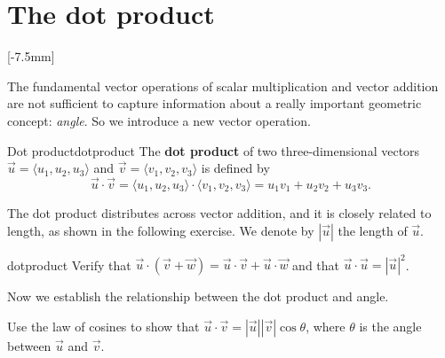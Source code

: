 \documentclass{watsonbook}
\begin{document}
\section{The dot product} \label{sec:dot} 

[-7.5mm]

The fundamental vector operations of scalar multiplication and vector
addition are not sufficient to capture information about a really important
geometric concept: \textit{angle}. So we introduce a new vector
operation.

\begin{defn}{Dot product}{dotproduct}
  The \textbf{dot product} of two three-dimensional vectors $\vec{u}
  = \langle u_1, u_2, u_3 \rangle$
  and $\vec{v} =  \langle v_1, v_2, v_3 \rangle$ is defined by 
  \[
    \vec{u} \cdot \vec{v} = \langle u_1, u_2, u_3 \rangle \cdot
    \langle v_1, v_2, v_3 \rangle = u_1 v_1 + u_2 v_2+ u_3v_3.
  \]
\end{defn}

The dot product distributes across vector addition, and it is closely
related to length, as shown in the following exercise. We denote by
$|\vec{u}|$ the length of $\vec{u}$. 

\begin{exercise}{}{dotproduct}
  Verify that $\vec{u} \cdot (\vec{v} + \vec{w}) = \vec{u} \cdot
  \vec{v} + \vec{u} \cdot \vec{w}$ and that $\vec{u} \cdot
  \vec{u} = |\vec{u}|^2$.
\end{exercise}

Now we establish the relationship between the dot product and angle.
\enlargethispage{5mm} 

\begin{example}{}{}
  Use the law of cosines to show that $\vec{u} \cdot \vec{v} =
  |\vec{u}| |\vec{v}| \cos\theta$, where $\theta$ is the angle
  between $\vec{u}$ and $\vec{v}$. 
\end{example}
\end{document}
